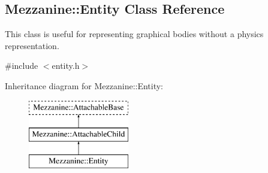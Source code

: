 \hypertarget{classMezzanine_1_1Entity}{
\subsection{Mezzanine::Entity Class Reference}
\label{classMezzanine_1_1Entity}
}


This class is useful for representing graphical bodies without a physics representation.  




{\ttfamily \#include $<$entity.h$>$}

Inheritance diagram for Mezzanine::Entity:\begin{figure}[H]
\begin{center}
\leavevmode
\includegraphics[height=3.000000cm]{classMezzanine_1_1Entity}
\end{center}
\end{figure}
